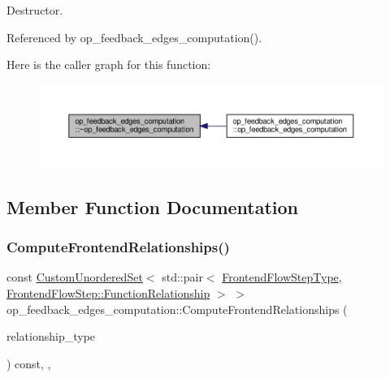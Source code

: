 Destructor. 



Referenced by op\+\_\+feedback\+\_\+edges\+\_\+computation().

Here is the caller graph for this function\+:
\nopagebreak
\begin{figure}[H]
\begin{center}
\leavevmode
\includegraphics[width=350pt]{d4/d6d/classop__feedback__edges__computation_a438cebd996233f9b4c61ada0052fa444_icgraph}
\end{center}
\end{figure}


\subsection{Member Function Documentation}
\mbox{\label{classop__feedback__edges__computation_ac9b97f89404bcc4be3eda0ec012e6728}} 
\subsubsection{\texorpdfstring{Compute\+Frontend\+Relationships()}{ComputeFrontendRelationships()}}
{\footnotesize\ttfamily const \hyperlink{classCustomUnorderedSet}{Custom\+Unordered\+Set}$<$ std\+::pair$<$ \hyperlink{frontend__flow__step_8hpp_afeb3716c693d2b2e4ed3e6d04c3b63bb}{Frontend\+Flow\+Step\+Type}, \hyperlink{classFrontendFlowStep_af7cf30f2023e5b99e637dc2058289ab0}{Frontend\+Flow\+Step\+::\+Function\+Relationship} $>$ $>$ op\+\_\+feedback\+\_\+edges\+\_\+computation\+::\+Compute\+Frontend\+Relationships (\begin{DoxyParamCaption}\item[{const \hyperlink{classDesignFlowStep_a723a3baf19ff2ceb77bc13e099d0b1b7}{Design\+Flow\+Step\+::\+Relationship\+Type}}]{relationship\+\_\+type }\end{DoxyParamCaption}) const\hspace{0.3cm}{\ttfamily [override]}, {\ttfamily [private]}, {\ttfamily [virtual]}}



